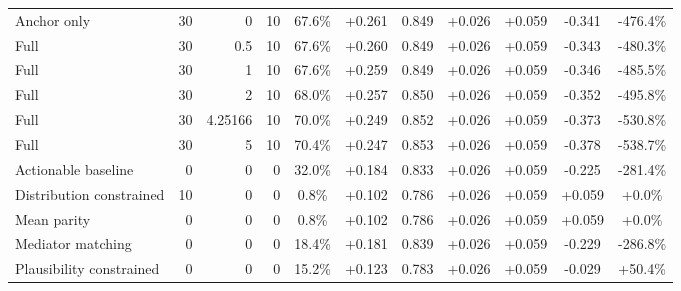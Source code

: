 \begin{table}[htbp]
\begin{tabular}{lrrrccccccc}
Anchor only & 30 & 0 & 10 & 67.6\% & +0.261 & 0.849 & +0.026 & +0.059 & -0.341 & -476.4\% \\
Full & 30 & 0.5 & 10 & 67.6\% & +0.260 & 0.849 & +0.026 & +0.059 & -0.343 & -480.3\% \\
Full & 30 & 1 & 10 & 67.6\% & +0.259 & 0.849 & +0.026 & +0.059 & -0.346 & -485.5\% \\
Full & 30 & 2 & 10 & 68.0\% & +0.257 & 0.850 & +0.026 & +0.059 & -0.352 & -495.8\% \\
Full & 30 & 4.25166 & 10 & 70.0\% & +0.249 & 0.852 & +0.026 & +0.059 & -0.373 & -530.8\% \\
Full & 30 & 5 & 10 & 70.4\% & +0.247 & 0.853 & +0.026 & +0.059 & -0.378 & -538.7\% \\
Actionable baseline & 0 & 0 & 0 & 32.0\% & +0.184 & 0.833 & +0.026 & +0.059 & -0.225 & -281.4\% \\
Distribution constrained & 10 & 0 & 0 & 0.8\% & +0.102 & 0.786 & +0.026 & +0.059 & +0.059 & +0.0\% \\
Mean parity & 0 & 0 & 0 & 0.8\% & +0.102 & 0.786 & +0.026 & +0.059 & +0.059 & +0.0\% \\
Mediator matching & 0 & 0 & 0 & 18.4\% & +0.181 & 0.839 & +0.026 & +0.059 & -0.229 & -286.8\% \\
Plausibility constrained & 0 & 0 & 0 & 15.2\% & +0.123 & 0.783 & +0.026 & +0.059 & -0.029 & +50.4\% \\
\bottomrule
\end{tabular}
\end{table}